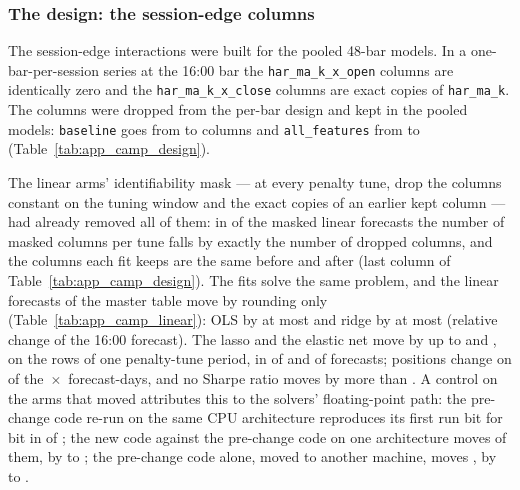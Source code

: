\subsubsection{The design: the session-edge columns}
\label{sec:app_camp_design}

The session-edge interactions were built for the pooled 48-bar models. In a
one-bar-per-session series at the 16:00 bar the \campNSessionEdgeHalf{}
\texttt{har\_ma\_k\_x\_open} columns are identically zero and the \campNSessionEdgeHalf{}
\texttt{har\_ma\_k\_x\_close} columns are exact copies of \texttt{har\_ma\_k}. The
\campNSessionEdge{} columns were dropped from the per-bar design and kept in the pooled
models: \texttt{baseline} goes from \campPOldBase{} to \campPNewBase{} columns and
\texttt{all\_features} from \campPOldAll{} to \campPNewAll{}
(Table~\ref{tab:app_camp_design}).

The linear arms' identifiability mask --- at every penalty tune, drop the columns constant
on the tuning window and the exact copies of an earlier kept column --- had already removed
all of them: in \campMaskDropAgree{} of the \campNLinearMasked{} masked linear forecasts the
number of masked columns per tune falls by exactly the number of dropped columns, and the
columns each fit keeps are the same before and after (last column of
Table~\ref{tab:app_camp_design}). The fits solve the same problem, and the \campNLinear{}
linear forecasts of the master table move by rounding only
(Table~\ref{tab:app_camp_linear}): OLS by at most \campOLSMaxRel{} and ridge by at most
\campRidgeMaxRel{} (relative change of the 16:00 forecast). The lasso and the elastic net
move by up to \campLassoMaxRel{} and \campEnetMaxRel{}, on the rows of one penalty-tune
period, in \campLassoMoved{} of \campLassoN{} and \campEnetMoved{} of \campEnetN{} forecasts;
positions change on \campPosChanged{} of the \campNLinear{}\,$\times$\,\campTradeDays{}
forecast-days, and no Sharpe ratio moves by more than \campMaxDSharpeLin{}. A control on the
\campAttrN{} arms that moved attributes this to the solvers' floating-point path: the
pre-change code re-run on the same CPU architecture reproduces its first run bit for bit in
\campAttrRepeat{} of \campAttrN{}; the new code against the pre-change code on one
architecture moves \campAttrDesignN{} of them, by \campAttrDesignLo{} to
\campAttrDesignHi{}; the pre-change code alone, moved to another machine, moves
\campAttrMachineN{}, by \campAttrMachineLo{} to \campAttrMachineHi{}.

